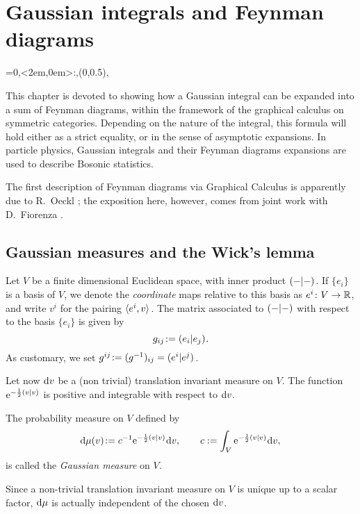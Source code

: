 

\chapter{Gaussian integrals and Feynman diagrams}
\label{cha:fd}
\everyxy={0,<2em,0em>:,(0,0.5),} %

This chapter is devoted to showing how a Gaussian integral can be
expanded into a sum of Feynman diagrams, within the framework of the
graphical calculus on symmetric categories.  Depending on the nature
of the integral, this formula will hold either as a strict equality,
or in the sense of asymptotic expansions. In particle physics,
Gaussian integrals and their Feynman diagrams expansions are used to
describe Bosonic statistics.

The first description of Feynman diagrams via Graphical Calculus is
apparently due to R.~Oeckl \cite{oeckl;braided-qft}; the exposition
here, however, comes from joint work with D.~Fiorenza
\cite{murri-fiorenza;feynman}. 


\section{Gaussian measures and the Wick's lemma} 

Let $V$ be a finite dimensional Euclidean space,
with inner product $( -|- )_{}$. If $\{e_i\}$ is a basis of
$V$, we denote the \emph{coordinate} maps relative to this basis as
$e^i\colon V\to\mathbb{R}$, and write $v^i$ for the pairing
$\langle e^i,v \rangle_{}$.  The matrix associated to $( -|- )_{}$ with
respect to the basis $\{e_i\}$ is given by
\begin{equation*}
  g_{ij} \joinrel:= \inner{e_i}{e_j}.
\end{equation*}
As customary, we set $g^{ij} \joinrel:= (g^{-1})_{ij} = \inner{e^i}{e^j}$.

Let now $\mathrm{d} v$ be a (non trivial) translation invariant measure on
$V$. The function $\mathrm{e}^{-\frac{1}{2}( v|v )_{}}$ is positive and
integrable with respect to $\mathrm{d} v$.
\begin{definition}\label{dfn:gaussian-measure}
  The probability measure on $V$ defined by
  \begin{equation*}
    \ud\mu(v) \joinrel:= c^{-1} \E^{-\onehalf\inner{v}{v}} \ud v, 
    \qquad
    c := {\int_V \E^{-\onehalf\inner{v}{v}} \ud v},
  \end{equation*}
  is called the \emph{Gaussian measure} on $V$.
\end{definition}
Since a non-trivial translation invariant measure on $V$ is unique up
to a scalar factor, $\mathrm{d}\mu$ is actually independent of the chosen
$\mathrm{d} v$.


